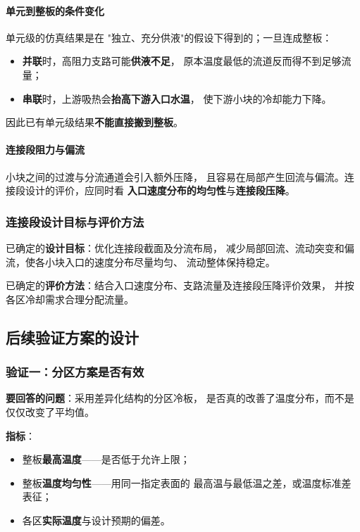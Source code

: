 \documentclass[stage2,fontset=fandol]{ydzjreport}
\begin{document}
\paragraph{单元到整板的条件变化}
单元级的仿真结果是在
"独立、充分供液"的假设下得到的；一旦连成整板：

\begin{itemize}
  \item \textbf{并联}时，高阻力支路可能\textbf{供液不足}，
        原本温度最低的流道反而得不到足够流量；
  \item \textbf{串联}时，上游吸热会\textbf{抬高下游入口水温}，
        使下游小块的冷却能力下降。
\end{itemize}

因此已有单元级结果\textbf{不能直接搬到整板}。

\paragraph{连接段阻力与偏流}
小块之间的过渡与分流通道会引入额外压降，
且容易在局部产生回流与偏流。连接段设计的评价，应同时看
\textbf{入口速度分布的均匀性}与\textbf{连接段压降}。


\subsubsection{连接段设计目标与评价方法}

已确定的\textbf{设计目标}：优化连接段截面及分流布局，
减少局部回流、流动突变和偏流，使各小块入口的速度分布尽量均匀、
流动整体保持稳定。

已确定的\textbf{评价方法}：结合入口速度分布、支路流量及连接段压降评价效果，
并按各区冷却需求合理分配流量。

\subsection{后续验证方案的设计}

\subsubsection{验证一：分区方案是否有效}

\textbf{要回答的问题}：采用差异化结构的分区冷板，
是否真的改善了温度分布，而不是仅仅改变了平均值。

\textbf{指标}：
\begin{itemize}
  \item 整板\textbf{最高温度}——是否低于允许上限；
  \item 整板\textbf{温度均匀性}——用同一指定表面的
        最高温与最低温之差，或温度标准差表征；
  \item 各区\textbf{实际温度}与设计预期的偏差。
\end{itemize}
\end{document}
